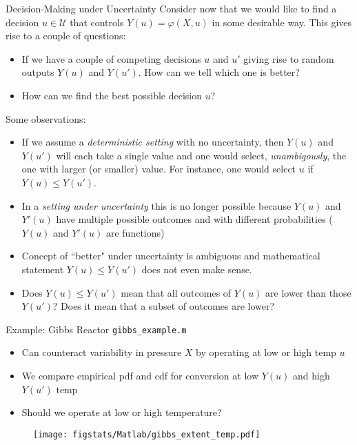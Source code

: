 \documentclass[handout,9pt]{beamer}
\begin{document}
%
\begin{frame}{Decision-Making under Uncertainty}
Consider now that we would like to find a decision $u\in \mathcal{U}$ that controls $Y(u)=\varphi(X,u)$ in some desirable way. This gives rise to a couple of questions:
\begin{block}{}
\begin{itemize}
 \setlength{\itemsep}{5pt}
\item If we have a couple of competing decisions $u$ and $u'$ giving rise to random outputs $Y(u)$ and $Y(u')$. How can we tell which one is better? 

\item How can we find the best possible decision $u$?
\end{itemize}
\end{block}
Some observations: 
\begin{itemize}
 \setlength{\itemsep}{5pt}
\item If we assume a {\em deterministic setting} with no uncertainty, then $Y(u)$ and $Y(u')$ will each take a single value and one would select, {\em unambigously},  the one with larger (or smaller) value. For instance, one would select $u$ if $Y(u)\leq Y(u')$.   

\item In a {\em setting under uncertainty} this is no longer possible because $Y(u)$ and $Y'(u)$ have multiple possible outcomes and with different probabilities ($Y(u)$ and $Y'(u)$ are functions)

\item Concept of ``better" under uncertainty is ambiguous and mathematical statement $Y(u)\leq Y(u')$ does not even make sense. 

\item Does $Y(u)\leq Y(u')$ mean that all outcomes of $Y(u)$ are lower than those $Y(u')$? Does it mean that a subset of outcomes are lower? 
\end{itemize}

\end{frame}

\begin{frame}{Example: Gibbs Reactor \footnotesize{\texttt{gibbs\_example.m}}}
\begin{itemize}
 \setlength{\itemsep}{5pt}
\item Can counteract variability in pressure $X$ by operating at low or high temp $u$
\item We compare empirical pdf and cdf for conversion at low $Y(u)$ and high $Y(u')$ temp
\item Should we operate at low or high temperature?
\end{itemize}
\begin{figure}[!htb]
    \centering
	\texttt{[image: figstats/Matlab/gibbs\_extent\_temp.pdf]}
\end{figure}

\end{frame}
\end{document}
